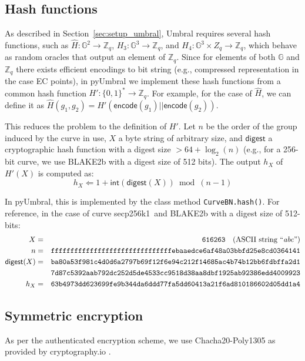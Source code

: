 \documentclass{amsart}
\newcommand{\pyumbral}{\textsf{pyUmbral}}
\newcommand{\secp}{\textsf{secp256k1}}
\begin{document}
\subsection{Hash functions}
As described in Section~\ref{sec:setup_umbral}, Umbral requires several hash functions, such as $\hat H: \mathbb G^2 \to \mathbb Z_q$, $H_3: \mathbb G^3 \to \mathbb Z_q$, and $H_4: \mathbb G^3 \times Z_q \to \mathbb Z_q$, which behave as random oracles that output an element of $\mathbb Z_q$. Since for elements of both $\mathbb G$ and $\mathbb Z_q$ there exists efficient encodings to bit string (e.g., compressed representation in the case EC points), in \textsf{pyUmbral} we implement these hash functions from a common hash function $H': \{0,1\}^* \to \mathbb Z_q$. For example, for the case of $\hat H$, we can define it as $\hat H(g_1, g_2) = H'(\mathsf{encode}(g_1)||\mathsf{encode}(g_2))$.

This reduces the problem to the definition of $H'$. Let $n$ be the order of the group induced by the curve in use, $X$ a byte string of arbitrary size, and $\mathsf{digest}$ a cryptographic hash function with a digest size $> 64 + \log_2(n)$  (e.g., for a 256-bit curve, we use \textsf{BLAKE2b} with a digest size of 512 bits). The output $h_X$ of $H'(X)$ is computed as:
$$h_X \Leftarrow 1 + \mathsf{int}(\mathsf{digest}(X)) \bmod (n-1)$$

In \pyumbral, this is implemented by the class method \texttt{CurveBN.hash()}. 
For reference, in the case of curve \secp~and BLAKE2b with a digest size of 512-bits:
\begin{align*} 
X &= &\mathtt{616263} \text{\quad(ASCII string ``\textit{abc}'')}\\
n &= &\mathtt{fffffffffffffffffffffffffffffffebaaedce6af48a03bbfd25e8cd0364141} \\ 
\mathsf{digest}(X) &=  &\mathtt{ba80a53f981c4d0d6a2797b69f12f6e94c212f14685ac4b74b12bb6fdbffa2d1}\\
 & &\mathtt{7d87c5392aab792dc252d5de4533cc9518d38aa8dbf1925ab92386edd4009923}\\
h_X &= &\mathtt{63b4973dd623699fe9b344da6ddd77fa5dd60413a21f6ad810186602d05dd1a4}
\end{align*}

\subsection{Symmetric encryption}
As per the authenticated encryption scheme, we use Chacha20-Poly1305 as provided by cryptography.io \cite{chacha20-pyca}.
\end{document}
